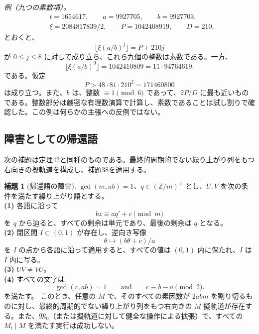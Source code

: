 \documentclass[11pt,reqno]{amsart}
\theoremstyle{definition}
\newtheorem{lemma}[theorem]{補題}
\theoremstyle{definition}
\theoremstyle{remark}
\begin{document}
\emph{例（九つの素数項）。}
\[
\begin{aligned}
&t=1654617,\qquad a=9927705,\qquad b=9927703,\\
&\xi=2084817839/2,\qquad P=1042408919,\qquad D=210,
\end{aligned}
\]
とおくと、
\[
\lfloor\xi(a/b)^j\rfloor=P+210j
\]
が \(0\le j\le8\) に対して成り立ち、これら九個の整数は素数である。一方、
\[
\lfloor\xi(a/b)^9\rfloor=1042410809=11\cdot94764619.
\]
である。仮定
\[
P>48\cdot81\cdot210^2=171460800
\]
は成り立つ。また、\(b\) は、整数 \(\equiv1\pmod6\) であって、\(2P/D\) に最も近いものである。整数部分は厳密な有理数演算で計算し、素数であることは試し割りで確認した。この例は何らかの主張への反例ではない。

\subsection{障害としての帰還語}\label{sec:E.2}

次の補題は定理42と同種のものである。最終的周期的でない繰り上がり列をもつ右向きの擬軌道を構成し、補題38を適用する。

\begin{samepage}
\begin{lemma}[帰還語の障害]\leavevmode\label{thm:69}
\(\gcd(m,ab)=1\)、\(q\in(\mathbb Z/m)^\times\) とし、\(U,V\) を次の条件を満たす繰り上がり語とする。\\
\textbf{(1)} 各語に沿って
\[
bz\equiv aq'+c\pmod m
\]
を \(q\) から辿ると、すべての剰余は単元であり、最後の剰余は \(q\) となる。\\
\textbf{(2)} 閉区間 \(I\subset(0,1)\) が存在し、逆向き写像
\[
\theta\mapsto(b\theta+c)/a
\]
を \(I\) の点から各語に沿って適用すると、すべての値は \((0,1)\) 内に保たれ、\(I\) は \(I\) 内に写る。\\
\textbf{(3)} \(UV\ne VU\)。\\
\textbf{(4)} すべての文字は
\[
\gcd(c,ab)=1\qquad\text{and}\qquad c\equiv b-a\pmod2.
\]
を満たす。
このとき、任意の \(M\) で、そのすべての素因数が \(2abm\) を割り切るものに対し、最終的周期的でない繰り上がり列をもつ右向きの \(M\) 擬軌道が存在する。また、\(\mathfrak M_0\)（または擬軌道に対して健全な操作による拡張）で、すべての \(M_t\mid M\) を満たす実行は成功しない。
\label{thm-end:69}
\end{lemma}
\end{samepage}
\end{document}
